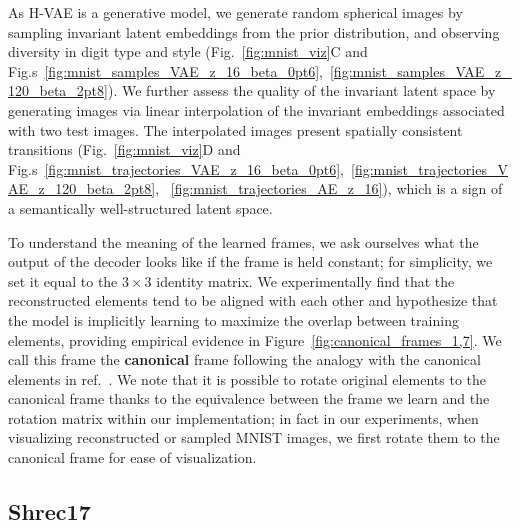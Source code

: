 As H-VAE is a generative model, we generate random spherical images by sampling invariant latent
embeddings from the prior distribution, and observing diversity in digit type and style
(Fig.~\ref{fig:mnist_viz}C and
Fig.s~\ref{fig:mnist_samples_VAE_z_16_beta_0pt6},~\ref{fig:mnist_samples_VAE_z_120_beta_2pt8}). We
further assess the quality of the invariant latent space by generating images via linear
interpolation of the invariant embeddings associated with two test images. The interpolated images
present spatially consistent transitions (Fig.~\ref{fig:mnist_viz}D and
Fig.s~\ref{fig:mnist_trajectories_VAE_z_16_beta_0pt6},~\ref{fig:mnist_trajectories_VAE_z_120_beta_2pt8},
~\ref{fig:mnist_trajectories_AE_z_16}), which is a sign of a semantically well-structured latent space.

To understand the meaning of the learned frames, we ask ourselves what the output of the decoder
looks like if the frame is held constant; for simplicity, we set it equal to the $3 \times 3$
identity matrix. We experimentally find that the reconstructed elements tend to be aligned with
each other and hypothesize that the model is implicitly learning to maximize the overlap between
training elements, providing empirical evidence in Figure~\ref{fig:canonical_frames_1,7}. We call
this frame the \textbf{canonical} frame following the analogy with the canonical elements in
ref.~\cite{winter_unsupervised_2022}. We note that it is possible to rotate original elements to
the canonical frame thanks to the equivalence between the frame we learn and the rotation matrix
within our implementation; in fact in our experiments, when visualizing reconstructed or sampled
MNIST images, we first rotate them to the canonical frame for ease of visualization.




\subsection{Shrec17}

